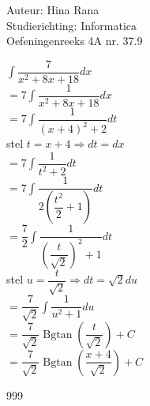 \documentclass[a4paper]{article}
\newcommand{\dint}{\displaystyle\int}
\begin{document}
\noindent \large Auteur: Hina Rana \\
\noindent \large Studierichting: Informatica\\
\noindent \large Oefeningenreeks 4A nr. 37.9\\

\medskip

\normalsize

$ \dint \dfrac{7}{x^2 + 8x + 18} dx $ \\

$ = 7 \dint \dfrac{1}{x^2 + 8x + 18} dx $ \\

$ = 7 \dint \dfrac{1}{(x+4)^2 + 2} dt $ \\

stel $t = x+4 \Rightarrow dt = dx$ \\

$ = 7 \dint \dfrac{1}{t^2 + 2} dt $ \\

$ = 7 \dint \dfrac{1}{2 \left(\dfrac{t^2}{2} + 1 \right)} dt $ \\

$ = \dfrac{7}{2} \dint \dfrac{1}{\left(\dfrac{t}{\sqrt{2}} \right)^2 + 1} dt $ \\

stel $u = \dfrac{t}{\sqrt{2}} \Rightarrow dt = \sqrt{2} du$ \\

$ = \dfrac{7}{\sqrt{2}} \dint \dfrac{1}{u^2 + 1} du $ \\

$ = \dfrac{7}{\sqrt{2}} \operatorname{Bgtan} \left(\dfrac{t}{\sqrt{2}} \right) + C $ \\

$ = \dfrac{7}{\sqrt{2}} \operatorname{Bgtan} \left(\dfrac{x+4}{\sqrt{2}} \right) + C $\\


\begin{thebibliography}{999}
\end{thebibliography}
\end{document}
